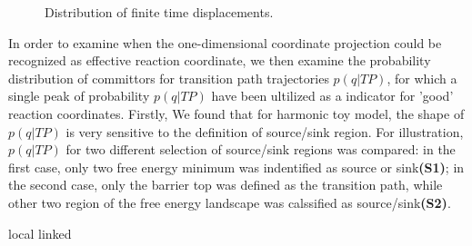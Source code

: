 \documentclass[11pt, a4paper]{article}
\begin{document}
\begin{figure}[htp]
  \noindent{}
  \caption{Distribution of finite time displacements.}
  \label{fig:dx}
\end{figure}

In order to examine when the one-dimensional coordinate projection could be recognized as effective reaction coordinate,
we then examine the probability distribution of committors for transition path trajectories $p(q|TP)$, for which a single peak of probability $p(q|TP)$ have been ultilized as a indicator for 'good' reaction coordinates.
 Firstly, We found that for harmonic toy model, the shape of $p(q|TP)$ is very sensitive to the definition of source/sink region. For illustration, $p(q|TP)$ for two different selection
  of source/sink regions was compared: in the first case, only two free energy minimum was indentified as source or sink\textbf{(S1)}; in the second case, only the barrier top was
  defined as the transition path, while other two region of the free energy landscape was calssified as source/sink\textbf{(S2)}.

local linked


\small


\end{document}
